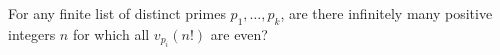 For any finite list of distinct primes \(p_1,\ldots,p_k\), are there
infinitely many positive integers \(n\) for which all
\(v_{p_i}(n!)\) are even?
